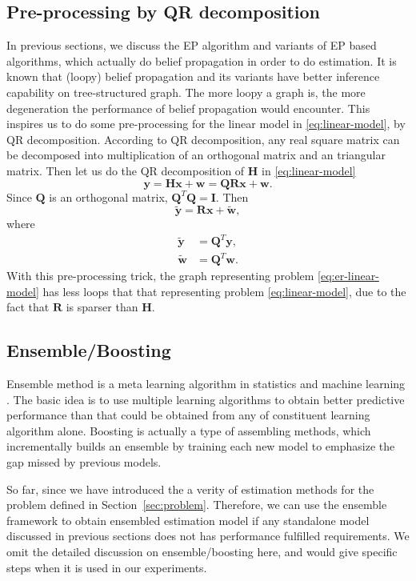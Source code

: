 \documentclass{article}
\begin{document}
\subsection{Pre-processing by QR decomposition}
In previous sections, we discuss the EP algorithm and variants of EP based algorithms, which actually do belief propagation in order to do estimation. It is known that (loopy) belief propagation and its variants have better inference capability on tree-structured graph. The more loopy a graph is, the more degeneration the performance of belief propagation would encounter.
This inspires us to do some pre-processing for the linear model in \eqref{eq:linear-model}, by QR decomposition. According to QR decomposition, any real square matrix can be decomposed into multiplication of an orthogonal matrix and an triangular matrix. Then let us do the QR decomposition of $\bm{H}$ in \eqref{eq:linear-model}
\begin{equation}
  \bm{y} = \bm{H}\bm{x} + \bm{w} = \bm{Q} \bm{R} \bm{x} + \bm{w}.
\end{equation}
Since $\bm{Q}$ is an orthogonal matrix, $\bm{Q}^{T} \bm{Q} = \bm{I}$. Then
\begin{equation}\label{eq:er-linear-model}
  \tilde{\bm{y}} =  \bm{R} \bm{x} + \tilde{\bm{w}},
\end{equation}
where
\begin{align}
  \tilde{\bm{y}} &= \bm{Q}^{T} \bm{y}, \\
  \tilde{\bm{w}} &= \bm{Q}^{T} \bm{w}.
\end{align}
With this pre-processing trick, the graph representing problem \eqref{eq:er-linear-model} has less loops that that representing problem \eqref{eq:linear-model}, due to the fact that $\bm{R}$ is sparser than $\bm{H}$.


\subsection{Ensemble/Boosting}\label{subsec:assemble}
Ensemble method is a meta learning algorithm in statistics and machine learning \cite{James:2014:ISL:2517747,DBLP:journals/corr/abs-1106-0257,Rokach2010}. The basic idea is to use multiple learning algorithms to obtain better predictive performance than that could be obtained from any of constituent learning algorithm alone.
Boosting is actually a type of assembling methods, which incrementally builds an ensemble by training each new model to emphasize the gap missed by previous models.

So far, since we have introduced the a verity of estimation methods for the problem defined in Section~\ref{sec:problem}. Therefore, we can use the ensemble framework to obtain ensembled estimation model if any standalone model discussed in previous sections does not has performance fulfilled requirements. We omit the detailed discussion on ensemble/boosting here, and would give specific steps when it is used in our experiments.
\end{document}
